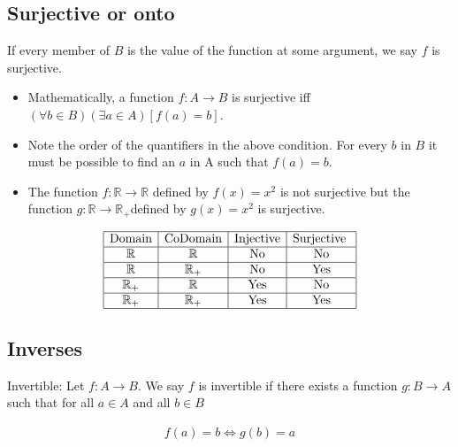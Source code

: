 \documentclass[12pt,a4paper,fleqn]{article}
\begin{document}
       
\subsection{Surjective or onto} 
 If every member of \(B\) is the value of the function at some argument, we say \(f\) is surjective.
 \begin{itemize}
   \item Mathematically, a function \(f: A \rightarrow B\) is surjective iff \((\forall b \in B)(\exists a \in A)[f(a)=b]\).
   \item Note the order of the quantifiers in the above condition. For every \(b\) in \(B\) it must be possible to find an \(a\) in A such that \(f(a)=b\).
   \item The function \(f: \mathbb{R} \rightarrow \mathbb{R}\) defined by \(f(x)=x^2\) is not surjective but the function \(g: \mathbb{R} \rightarrow \mathbb{R}_{+}\)defined by \(g(x)=x^2\) is surjective.
 \end{itemize}

 
   \begin{align*}
    \begin{array}{|c|c|c|c|}
      \hline \text{Domain} & \text{CoDomain} & \text{Injective} & \text{Surjective } \\
      \hline  \mathbb{R} & \mathbb{R} & \text{No} & \text{No} \\
      \hline \mathbb{R} & \mathbb{R}_{+} & \text{No}& \text{Yes} \\
      \hline \mathbb{R}_{+} & \mathbb{R} & \text{Yes} & \text{No} \\
      \hline \mathbb{R}_{+} &\mathbb{R}_{+} & \text{Yes} & \text{Yes}\\
      \hline
    \end{array}  
  \end{align*}


  \subsection{Inverses}
  Invertible: Let \(f: A \rightarrow B\). We say \(f\) is invertible if there exists a function \(g: B \rightarrow A\) such that for all \(a \in A\) and all \(b \in B\)

  \begin{align*}
  f(a)=b \Longleftrightarrow g(b)=a
  \end{align*}
  
\end{document}
